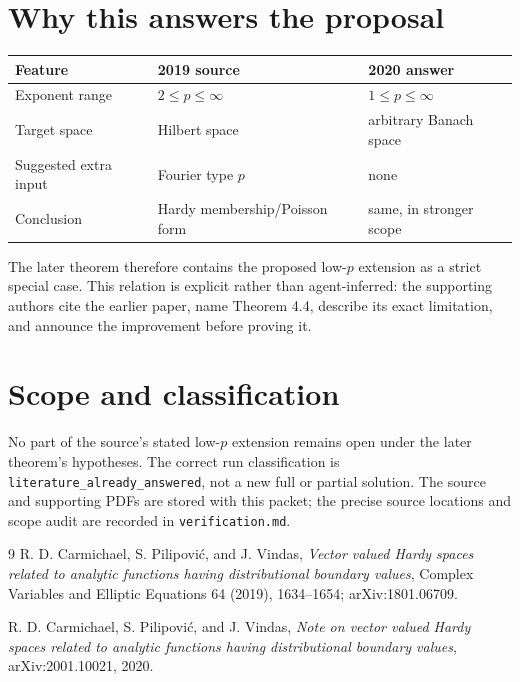 \documentclass[11pt]{article}
\begin{document}
\section{Why this answers the proposal}

\begin{center}
\begin{tabular}{@{}lll@{}}
\toprule
Feature & 2019 source & 2020 answer \\
\midrule
Exponent range & $2\leq p\leq\infty$ & $1\leq p\leq\infty$ \\
Target space & Hilbert space & arbitrary Banach space \\
Suggested extra input & Fourier type $p$ & none \\
Conclusion & Hardy membership/Poisson form & same, in stronger scope \\
\bottomrule
\end{tabular}
\end{center}

The later theorem therefore contains the proposed low-$p$ extension as a
strict special case.  This relation is explicit rather than agent-inferred:
the supporting authors cite the earlier paper, name Theorem 4.4, describe its
exact limitation, and announce the improvement before proving it.

\section{Scope and classification}

No part of the source's stated low-$p$ extension remains open under the later
theorem's hypotheses.  The correct run classification is
\texttt{literature\_already\_answered}, not a new full or partial solution.
The source and supporting PDFs are stored with this packet; the precise
source locations and scope audit are recorded in \texttt{verification.md}.

\begin{thebibliography}{9}
R. D. Carmichael, S. Pilipovi\'{c}, and J. Vindas,
\emph{Vector valued Hardy spaces related to analytic functions having
distributional boundary values}, Complex Variables and Elliptic Equations
64 (2019), 1634--1654; arXiv:1801.06709.

R. D. Carmichael, S. Pilipovi\'{c}, and J. Vindas,
\emph{Note on vector valued Hardy spaces related to analytic functions having
distributional boundary values}, arXiv:2001.10021, 2020.
\end{thebibliography}
\end{document}
